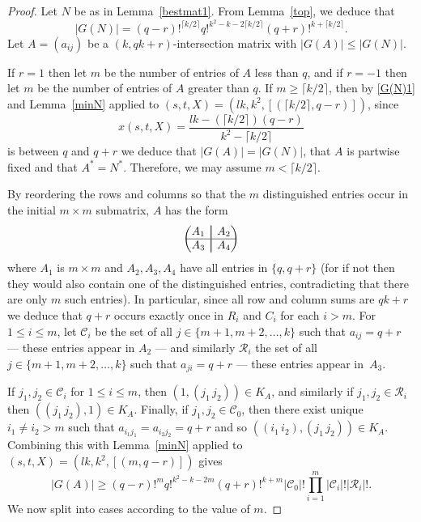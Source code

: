\documentclass[10pt,a4paper]{amsart}
\newcommand\aug{\fboxsep=-\fboxrule\!\!\!\fbox{\strut}\!\!\!}
\begin{document}
\begin{proof}
Let $N$ be as in Lemma~\ref{bestmat1}. From Lemma~\ref{top}, we deduce that \begin{equation}\label{G(N)1}|G(N)|=(q-r)!^{\lceil k/2\rceil}q!^{k^2-k-2\lceil k/2\rceil}(q+r)!^{k+\lceil k/2\rceil}.\end{equation} 
Let $A=(a_{ij})$ be a $(k,qk+r)$-intersection matrix with $|G(A)|\leq |G(N)|$. 

If $r=1$ then let $m$ be the number of entries of $A$ less than $q$, and if $r=-1$ then let $m$ be the number of entries of $A$ greater than $q$. If $m\geq\lceil k/2\rceil$, then by \eqref{G(N)1} and Lemma~\ref{minN} applied to $(s,t,X)=(lk,k^2,[(\lceil k/2\rceil,q-r)])$, since $$ x(s,t,X)=\frac{lk-(\lceil k/2\rceil)(q-r)}{k^2-\lceil k/2\rceil}$$ is between $q$ and $q+r$ we deduce that $|G(A)|=|G(N)|$, that $A$ is partwise fixed and that $A^*=N^*$. Therefore, we may assume $m<\lceil k/2\rceil$.

By reordering the rows and columns so that the $m$ distinguished entries occur in the initial $m\times m$ submatrix, $A$ has the form
$$\begin{pmatrix}
A_1&\aug&A_2\\\hline
A_3&\aug&A_4\\
\end{pmatrix}$$
where $A_1$ is $m\times m$ and $A_2,A_3,A_4$ have all entries in $\{q,q+r\}$  (for if not then they would also contain one of the distinguished entries, contradicting that there are only $m$ such entries). In particular, since all row and column sums are $qk+r$ we deduce that $q+r$ occurs exactly once in $R_i$ and $C_i$ for each $i>m$. For $1\leq i\leq m$, let $\mathcal{C}_i$ 
 be the set of all $j\in \{m+1,m+2,\dots, k\}$ such that $a_{ij}=q+r$ --- these entries appear in $A_2$ --- and similarly $\mathcal{R}_i$ 
 the set of all $ j\in \{m+1,m+2,\dots, k\}$ such that $a_{ji}=q+r$ --- these entries appear in~$A_3$. 

If $j_1,j_2\in \mathcal{C}_i$ for $1\leq i\leq m$, then $(1, (j_1\, j_2))\in K_A$, and similarly if $j_1,j_2\in \mathcal{R}_i$ then $((j_1\, j_2),1)\in K_A$. Finally, if $j_1,j_2\in \mathcal{C}_0$, then there exist unique $i_1\ne i_2>m$ such that $a_{i_1j_1}=a_{i_2j_2}=q+r$ and so $((i_1\, i_2), (j_1\, j_2))\in K_A$. Combining this with Lemma~\ref{minN} applied to $(s,t,X)=(lk,k^2,[(m,q-r)])$ gives \begin{equation}\label{asize}|G(A)|\geq (q-r)!^mq!^{k^2-k-2m}(q+r)!^{k+m}|\mathcal{C}_0|!\prod_{i=1}^{m}|\mathcal{C}_i|!|\mathcal{R}_i|!.\end{equation} We now split into cases according to the value of $m$.


\end{proof}
\end{document}
